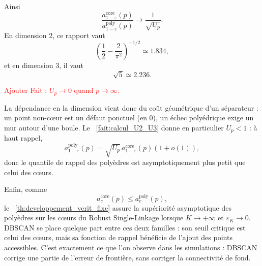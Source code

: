 Ainsi
\[
    \frac{a_{1-\varepsilon}^{\mathrm{core}}(p)}
         {a_{1-\varepsilon}^{\mathrm{poly}}(p)}
    \longrightarrow
    \frac1{\sqrt{U_p}}.
\]
En dimension $2$, ce rapport vaut
\[
    \left(\frac12-\frac2{\pi^2}\right)^{-1/2}
    \simeq 1.834,
\]
et en dimension $3$, il vaut
\[
    \sqrt5\simeq2.236.
\]

\textcolor{red}{Ajouter Fait : $U_p \to 0$ quand $p\to \infty$.}

La dépendance en la dimension vient donc du coût géométrique d'un séparateur : un point non-cœur est un défaut ponctuel (en $0$), un échec polyédrique exige un mur autour d'une boule. Le \Fact~\ref{fait:calcul_U2_U3} donne en particulier $U_p<1$ : à haut rappel,
\[
    a_{1-\varepsilon}^{\mathrm{poly}}(p)
    =
    \sqrt{U_p}\,
    a_{1-\varepsilon}^{\mathrm{core}}(p)
    (1+o(1)),
\]
donc le quantile de rappel des polyèdres est asymptotiquement plus petit que celui des cœurs.

Enfin, comme
\[
    a_{c}^{\mathrm{core}}(p) \le a_{c}^{\mathrm{poly}}(p),
\]
le \Th~\ref{th:developpement_vcrit_fixe} assure la supériorité asymptotique des polyèdres sur les cœurs du Robust Single-Linkage lorsque $K\to+\infty$ et $\varepsilon_K\to0$. DBSCAN se place quelque part entre ces deux familles : son seuil critique est celui des cœurs, mais sa fonction de rappel bénéficie de l'ajout des points accessibles. C'est exactement ce que l'on observe dans les simulations : DBSCAN corrige une partie de l'erreur de frontière, sans corriger la connectivité de fond.

